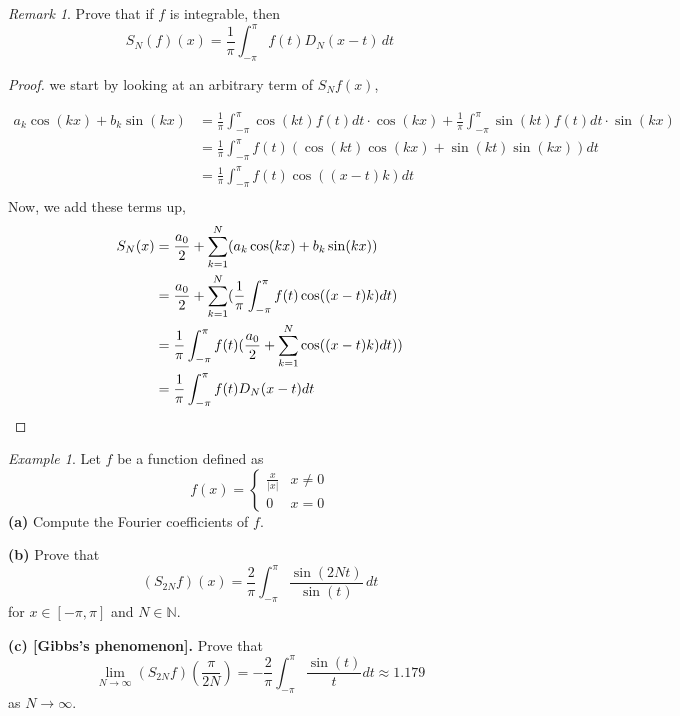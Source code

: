 \documentclass{article}
\theoremstyle{remark}
\newtheorem*{remark}{Remark}
\theoremstyle{lemma}
\theoremstyle{example}
\newtheorem*{example}{Example}
\theoremstyle{proofTrial}
\theoremstyle{definition}
\begin{document}
     \begin{remark}
         Prove that if \(f\) is integrable, then
    \[
    S_N(f)(x) = \frac{1}{\pi}\int_{-\pi}^{\pi}f(t)D_N(x-t)\,dt
    \]
     \end{remark}
    \begin{proof}
        we start by looking at an arbitrary term of $S_Nf(x)$,

        \begin{align*}
            a_k\cos(kx) + b_k\sin(kx) &= \frac{1}{\pi}\int_{-\pi}^{\pi}\cos(kt)f(t)dt \cdot \cos(kx) + \frac{1}{\pi}\int_{-\pi}^{\pi}\sin(kt)f(t)dt \cdot \sin(kx)\\
        &= \frac{1}{\pi}\int_{-\pi}^{\pi}f(t)(\cos(kt)\cos(kx) + \sin(kt)\sin(kx))dt\\
        &= \frac{1}{\pi}\int_{-\pi}^{\pi}f(t)\cos((x-t)k)dt\\
        \end{align*}
        Now, we add these terms up,
        \begin{align*}
            S_N(x) &=\frac{a_0}{2} + \sum_{k=1}^{N} (a_k\cos(kx) + b_k\sin(kx))\\
            &= \frac{a_0}{2} + \sum_{k=1}^{N}(\frac{1}{\pi}\int_{-\pi}^{\pi}f(t)\cos((x-t)k)dt) \\
            &= \frac{1}{\pi}\int_{-\pi}^{\pi}f(t) (\frac{a_0}{2} + \sum_{k=1}^{N}\cos((x-t)k)dt)) \\
            &= \frac{1}{\pi}\int_{-\pi}^{\pi}f(t)D_N(x-t)dt \qedhere
        \end{align*}

    \end{proof}

     \begin{example}
     Let \(f\) be a function defined as
    \[
    f(x) = \begin{cases}
        \frac{x}{|x|} & x \neq 0\\
        0             & x = 0
    \end{cases}
    \]
    \textbf{(a)} Compute the Fourier coefficients of $f$.

    \textbf{(b)} Prove that
    \[
    (S_{2N} f)(x) = \frac{2}{\pi} \int_{-\pi}^{\pi} \frac{\sin(2Nt)}{\sin(t)} \,dt
    \]
    for $x \in [-\pi,\pi]$ and $N \in \mathbb{N}$.

    \textbf{(c) [Gibbs's phenomenon].} Prove that
    \[
    \lim_{N \to \infty}(S_{2N} f)(\frac{\pi}{2N}) = -\frac{2}{\pi}\int_{-\pi}^{\pi} \frac{\sin(t)}{t} dt \approx 1.179
    \]
    as $N \to \infty$.
     \end{example}
\end{document}

